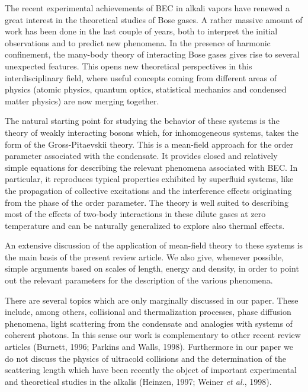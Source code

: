 The recent experimental achievements of BEC in alkali vapors have renewed  
a great interest in the theoretical studies of Bose gases. A rather massive 
amount of work has been done in the last couple of years, both to 
interpret the initial observations and to predict new phenomena. 
In the presence of harmonic confinement, the many-body theory of
interacting Bose gases gives rise to several unexpected features.
This opens new theoretical perspectives in this interdisciplinary 
field, where useful concepts coming from different areas of 
physics (atomic physics, quantum optics, statistical mechanics and
condensed matter physics) are now merging together.  

The natural starting point for studying the behavior of these 
systems is the theory of weakly interacting bosons which, for inhomogeneous
systems, takes the form of the Gross-Pitaevskii theory. This
is a mean-field approach for the order parameter associated with the
condensate. It provides closed and relatively simple equations
for describing the relevant  phenomena associated with BEC. In 
particular, it reproduces typical properties exhibited by superfluid 
systems, like the propagation of collective excitations and the 
interference effects originating from the phase of the order parameter. 
The theory is well suited to describing most of the effects of two-body 
interactions in these dilute gases at zero temperature and can be 
naturally generalized to explore also thermal effects. 

An extensive discussion of the application of mean-field theory to 
these systems is the main basis of the present review article.
We  also give, whenever possible, simple arguments based on scales of 
length, energy and density, in order to point out the relevant parameters 
for the description of the various phenomena. 

There are several topics which are only marginally discussed in our 
paper. These include, among others, collisional and thermalization 
processes, phase diffusion phenomena, light scattering from the condensate 
and analogies with systems of coherent photons.  In this sense our work 
is complementary to other recent review articles (Burnett, 1996; Parkins 
and Walls, 1998). Furthermore in our paper we do not  discuss the physics 
of ultracold collisions and the determination of the scattering length 
which have been recently the object of important experimental and 
theoretical studies in the alkalis (Heinzen, 1997; Weiner {\it et al.}, 
1998).

